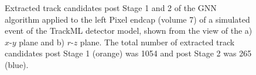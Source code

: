 \begin{figure}[htbp]%
    \centering
    \hfill
    \caption{Extracted track candidates post Stage 1 and 2 of the GNN algorithm applied to the left Pixel endcap (volume 7) of a simulated event of the TrackML detector model, shown from the view of the a) $x$-$y$ plane and b) $r$-$z$ plane. The total number of extracted track candidates post Stage 1 (orange) was 1054 and post Stage 2 was 265 (blue).}%
    \label{fig:trackml-results-endcap-extracted-v2}%
\end{figure}

